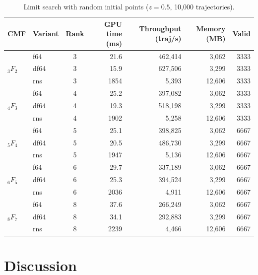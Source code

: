 \documentclass[11pt,a4paper]{article}
\begin{document}
\begin{table}[h]
\centering
\caption{Limit search with random initial points ($z=0.5$, 10{,}000 trajectories).}
\label{tab:random-limit}
\small
\begin{tabular}{llcrrrr}
\toprule
CMF & Variant & Rank & GPU time (ms) & Throughput (traj/s) & Memory (MB) & Valid \\
\midrule
\multirow{3}{*}{${}_3F_2$} & f64  & 3 & 21.6 & 462{,}414 & 3{,}062 & 3333 \\
                           & df64 & 3 & 15.9 & 627{,}506 & 3{,}299 & 3333 \\
                           & rns  & 3 & 1854 & 5{,}393   & 12{,}606 & 3333 \\
\midrule
\multirow{3}{*}{${}_4F_3$} & f64  & 4 & 25.2 & 397{,}082 & 3{,}062 & 3333 \\
                           & df64 & 4 & 19.3 & 518{,}198 & 3{,}299 & 3333 \\
                           & rns  & 4 & 1902 & 5{,}258   & 12{,}606 & 3333 \\
\midrule
\multirow{3}{*}{${}_5F_4$} & f64  & 5 & 25.1 & 398{,}825 & 3{,}062 & 6667 \\
                           & df64 & 5 & 20.5 & 486{,}730 & 3{,}299 & 6667 \\
                           & rns  & 5 & 1947 & 5{,}136   & 12{,}606 & 6667 \\
\midrule
\multirow{3}{*}{${}_6F_5$} & f64  & 6 & 29.7 & 337{,}189 & 3{,}062 & 6667 \\
                           & df64 & 6 & 25.3 & 394{,}524 & 3{,}299 & 6667 \\
                           & rns  & 6 & 2036 & 4{,}911   & 12{,}606 & 6667 \\
\midrule
\multirow{3}{*}{${}_8F_7$} & f64  & 8 & 37.6 & 266{,}249 & 3{,}062 & 6667 \\
                           & df64 & 8 & 34.1 & 292{,}883 & 3{,}299 & 6667 \\
                           & rns  & 8 & 2239 & 4{,}466   & 12{,}606 & 6667 \\
\bottomrule
\end{tabular}
\end{table}

\section{Discussion}
\end{document}
